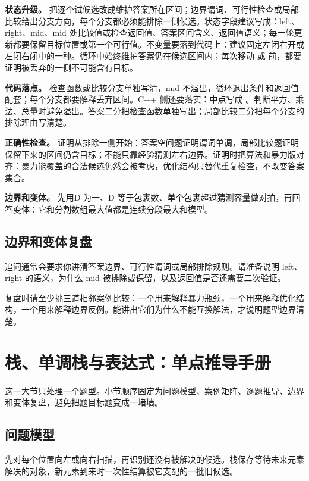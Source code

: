 \textbf{状态升级。} 把逐个试候选改成维护答案所在区间；边界谓词、可行性检查或局部比较给出分支方向，每个分支都必须能排除一侧候选。状态字段建议写成：left、right、mid、mid 处比较值或检查返回值、答案区间含义、返回值语义；每一轮更新都要保留目标位置或第一个可行值。不变量要落到代码上：建议固定左闭右开或左闭右闭中的一种。循环中始终维护答案仍在候选区间内；每次移动  或  前，都要证明被丢弃的一侧不可能含有目标。

\textbf{代码落点。} 检查函数或比较分支单独写清，mid 不溢出，循环退出条件和返回值配套；每个分支都要解释丢弃区间。C++ 侧还要落实：中点写成 。判断平方、乘法、总量时避免溢出。答案二分把检查函数单独写出；局部比较二分把每个分支的排除理由写清楚。

\textbf{正确性检查。} 证明从排除一侧开始：答案空间题证明谓词单调，局部比较题证明保留下来的区间仍含目标；不能只靠经验猜测左右边界。证明时把算法和暴力版对齐：暴力能覆盖的合法候选仍然会被考虑，优化结构只替代重复检查，不改变答案集合。

\textbf{边界和变体。} 先用D 为一、D 等于包裹数、单个包裹超过猜测容量做对拍，再回答变体：它和分割数组最大值都是连续分段最大和模型。

\subsection{边界和变体复盘}

追问通常会要求你讲清答案边界、可行性谓词或局部排除规则。请准备说明 left、right 的语义，为什么 mid 被排除或保留，以及返回值是否还需要二次验证。

复盘时请至少挑三道相邻案例比较：一个用来解释暴力瓶颈，一个用来解释优化结构，一个用来解释边界反例。能讲出它们为什么不能互换解法，才说明题型边界清楚。

\section{栈、单调栈与表达式：单点推导手册}
这一大节只处理一个题型。小节顺序固定为问题模型、案例矩阵、逐题推导、边界和变体复盘，避免把题目标题变成一堵墙。

\subsection{问题模型}

先对每个位置向左或向右扫描，再识别还没有被解决的候选。栈保存等待未来元素解决的对象，新元素到来时一次性结算被它支配的一批旧候选。

